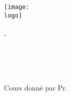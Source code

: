 \begin{titlepage}
\begin{center}
\texttt{[image: \\logo]}\\
\vspace{1.5cm}
    \hrulefill \\
    \vspace{0.5cm}
{\huge \courselabel - \coursename}\\
\vspace{1cm}
{\LARGE \hwkname}\\
\vspace{0.5cm}
\hrulefill

\vspace{2cm}
\session\\

\vspace{2cm}
\name\\

\vspace{2cm}


\vfill

Cours donné par Pr. \prof
\end{center}

\newpage
\end{titlepage}
